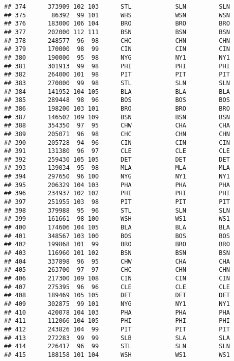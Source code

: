 \documentclass[]{article}
\begin{document}
\begin{verbatim}
## 374      373909 102 103      STL            SLN         SLN
## 375       86392  99 101      WHS            WSN         WSN
## 376      183000 106 104      BRO            BRO         BRO
## 377      202000 112 111      BSN            BSN         BSN
## 378      248577  96  98      CHC            CHN         CHN
## 379      170000  98  99      CIN            CIN         CIN
## 380      190000  95  98      NYG            NY1         NY1
## 381      301913  99  98      PHI            PHI         PHI
## 382      264000 101  98      PIT            PIT         PIT
## 383      270000  99  98      STL            SLN         SLN
## 384      141952 104 105      BLA            BLA         BLA
## 385      289448  98  96      BOS            BOS         BOS
## 386      198200 103 101      BRO            BRO         BRO
## 387      146502 109 109      BSN            BSN         BSN
## 388      354350  97  95      CHW            CHA         CHA
## 389      205071  96  98      CHC            CHN         CHN
## 390      205728  94  96      CIN            CIN         CIN
## 391      131380  96  97      CLE            CLE         CLE
## 392      259430 105 105      DET            DET         DET
## 393      139034  95  98      MLA            MLA         MLA
## 394      297650  96 100      NYG            NY1         NY1
## 395      206329 104 103      PHA            PHA         PHA
## 396      234937 102 102      PHI            PHI         PHI
## 397      251955 103  98      PIT            PIT         PIT
## 398      379988  95  96      STL            SLN         SLN
## 399      161661  98 100      WSH            WS1         WS1
## 400      174606 104 105      BLA            BLA         BLA
## 401      348567 103 100      BOS            BOS         BOS
## 402      199868 101  99      BRO            BRO         BRO
## 403      116960 101 102      BSN            BSN         BSN
## 404      337898  96  95      CHW            CHA         CHA
## 405      263700  97  97      CHC            CHN         CHN
## 406      217300 109 108      CIN            CIN         CIN
## 407      275395  96  96      CLE            CLE         CLE
## 408      189469 105 105      DET            DET         DET
## 409      302875  99 101      NYG            NY1         NY1
## 410      420078 104 103      PHA            PHA         PHA
## 411      112066 104 105      PHI            PHI         PHI
## 412      243826 104  99      PIT            PIT         PIT
## 413      272283  99  99      SLB            SLA         SLA
## 414      226417  96  99      STL            SLN         SLN
## 415      188158 101 104      WSH            WS1         WS1

\end{verbatim}
\end{document}
